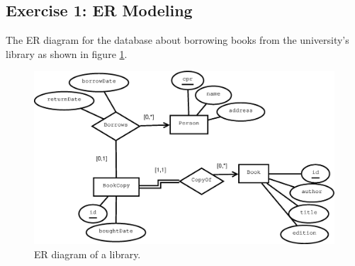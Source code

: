 
\subsection{Exercise 1: ER Modeling}
The ER diagram for the database about borrowing books from the university's library as shown in figure \ref{fig:ss3-ex1-er}.

\begin{figure}[h]
  \centering
  \includegraphics[width=\linewidth]{3-12.03.14/exercise1.eps}
  \caption{ER diagram of a library.}\label{fig:ss3-ex1-er}
\end{figure}

